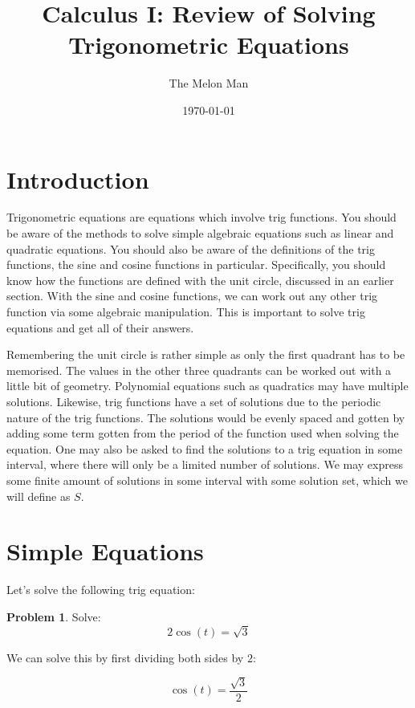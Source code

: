 \documentclass[12pt]{article}
\title{Calculus I: Review of Solving Trigonometric Equations}
\author{The Melon Man}
\date{\today}
\theoremstyle{definition}
\newtheorem{problem}{Problem}
\begin{document}
\maketitle

\section{Introduction}
Trigonometric equations are equations which involve trig functions.
You should be aware of the methods to solve simple algebraic equations such as linear and quadratic equations.
You should also be aware of the definitions of the trig functions, the sine and cosine functions in particular.
Specifically, you should know how the functions are defined with the unit circle, discussed in an earlier section.
With the sine and cosine functions, we can work out any other trig function via some algebraic manipulation.
This is important to solve trig equations and get all of their answers.

Remembering the unit circle is rather simple as only the first quadrant has to be memorised.
The values in the other three quadrants can be worked out with a little bit of geometry.
Polynomial equations such as quadratics may have multiple solutions.
Likewise, trig functions have a set of solutions due to the periodic nature of the trig functions.
The solutions would be evenly spaced and gotten by adding some term gotten from the period of the function used when solving the equation.
One may also be asked to find the solutions to a trig equation in some interval, where there will only be a limited number of solutions.
We may express some finite amount of solutions in some interval with some solution set, which we will define as $S$.

\section{Simple Equations}
Let's solve the following trig equation:

\begin{problem}
Solve:
\begin{equation*}
    {2\cos(t) = \sqrt{3}} \label{eq:1}
\end{equation*}
\end{problem}

We can solve this by first dividing both sides by $2$:

\begin{equation}
    \cos(t) = \frac{\sqrt{3}}{2}
\end{equation}
\end{document}
